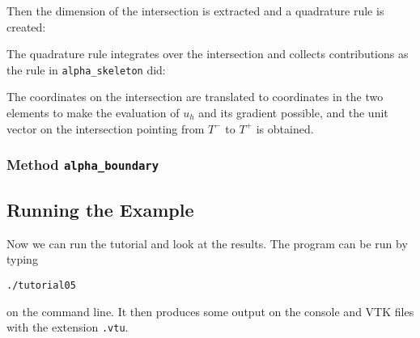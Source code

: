 \documentclass[a4paper,12pt]{article}
\begin{document}
Then the dimension of the intersection is extracted and a quadrature rule is
created:


The quadrature rule integrates over the intersection and collects contributions
as the rule in \lstinline{alpha_skeleton} did:


The coordinates on the intersection are translated to coordinates in the two
elements to make the evaluation of $u_h$ and its gradient possible, and the
unit vector on the intersection pointing from $T^-$ to $T^+$ is obtained.


\subsubsection*{Method \lstinline{alpha_boundary}}

\subsection{Running the Example}

Now we can run the tutorial and look at the results.
The program can be run by typing

\begin{lstlisting}[basicstyle=\ttfamily\small,
frame=single,
backgroundcolor=\color{listingbg}]
./tutorial05
\end{lstlisting}
on the command line. It then produces some output on the console
and VTK files with the extension \lstinline{.vtu}.
\end{document}
